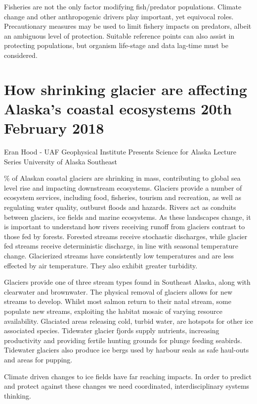 \documentclass{article}
\begin{document}
\noindent Fisheries are not the only factor modifying fish/predator populations. Climate change and other anthropogenic drivers play important, yet equivocal roles. Precautionary measures may be used to limit fishery impacts on predators, albeit an ambiguous level of protection. Suitable reference points can also assist in protecting populations, but organism life-stage and data lag-time must be considered.  

\section{How shrinking glacier are affecting Alaska’s coastal ecosystems 20th February 2018}

Eran Hood - UAF Geophysical Institute Presents Science for Alaska Lecture Series
University of Alaska Southeast \bigskip

\% of Alaskan coastal glaciers are shrinking in mass, contributing to global sea level rise and impacting downstream ecosystems. Glaciers provide a number of ecosystem services, including food, fisheries, tourism and recreation, as well as regulating water quality, outburst floods and hazards. Rivers act as conduits between glaciers, ice fields and marine ecosystems. As these landscapes change, it is important to understand how rivers receiving runoff from glaciers contrast to those fed by forests. Forested streams receive stochastic discharges, while glacier fed streams receive deterministic discharge, in line with seasonal temperature change. Glacierized streams have consistently low temperatures and are less effected by air temperature. They also exhibit greater turbidity. \bigskip
 
\noindent Glaciers provide one of three stream types found in Southeast Alaska, along with clearwater and brownwater. The physical removal of glaciers allows for new streams to develop. Whilst most salmon return to their natal stream, some populate new streams, exploiting the habitat mosaic of varying resource availability. Glaciated areas releasing cold, turbid water, are hotspots for other ice associated species. Tidewater glacier fjords supply nutrients, increasing productivity and providing fertile hunting grounds for plunge feeding seabirds. Tidewater glaciers also produce ice bergs used by harbour seals as safe haul-outs and areas for pupping. \bigskip

\noindent Climate driven changes to ice fields have far reaching impacts. In order to predict and protect against these changes we need coordinated, interdisciplinary systems thinking.
\end{document}
